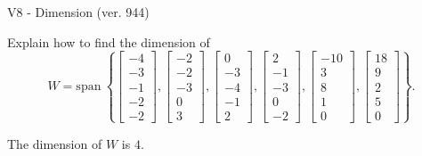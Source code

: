 \begin{exercise}
  \begin{exerciseTitle}V8 - Dimension (ver. 944)\end{exerciseTitle}
  \begin{exerciseStatement}
    Explain how to find the dimension of 
\[W=\mathrm{span}\ \left\{\left[\begin{array}{r}
-4 \\
-3 \\
-1 \\
-2 \\
-2
\end{array}\right] , \left[\begin{array}{r}
-2 \\
-2 \\
-3 \\
0 \\
3
\end{array}\right] , \left[\begin{array}{r}
0 \\
-3 \\
-4 \\
-1 \\
2
\end{array}\right] , \left[\begin{array}{r}
2 \\
-1 \\
-3 \\
0 \\
-2
\end{array}\right] , \left[\begin{array}{r}
-10 \\
3 \\
8 \\
1 \\
0
\end{array}\right] , \left[\begin{array}{r}
18 \\
9 \\
2 \\
5 \\
0
\end{array}\right]\right\}.\]



  \end{exerciseStatement}
  \begin{exerciseAnswer}
   The dimension of \(W\) is  \(4\).
  


  \end{exerciseAnswer}
\end{exercise}